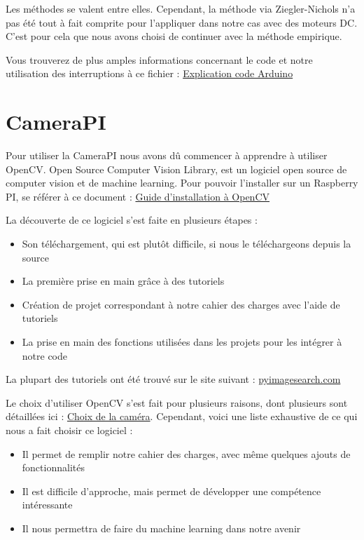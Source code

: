 \documentclass[
	a4paper,									%
	11pt,										%
	twoside,									%
	openright,									%
	notitlepage,									%
	parskip=half,								%
]{scrreprt}										%
\begin{document}
Les méthodes se valent entre elles. Cependant, la méthode via Ziegler-Nichols n'a pas été tout à fait comprite pour l'appliquer 
dans notre cas avec des moteurs DC. C'est pour cela que nous avons choisi de continuer avec la méthode empirique. \par


Vous trouverez de plus amples informations concernant le code et notre utilisation des interruptions
à ce fichier : \href{run:./Code_Arduino.pdf}{Explication code Arduino}



\section{CameraPI}

Pour utiliser la CameraPI nous avons dû commencer à apprendre à utiliser OpenCV. 
Open Source Computer Vision Library, est un logiciel open source de computer vision et de machine learning. 
Pour pouvoir l'installer sur un Raspberry PI, se référer à ce document : \href{run:./Installation_OpenCV.pdf}{Guide d'installation à OpenCV}\par

La découverte de ce logiciel s'est faite en plusieurs étapes : 

\begin{itemize}
	\item Son téléchargement, qui est plutôt difficile, si nous le téléchargeons depuis la source
	\item La première prise en main grâce à des tutoriels
	\item Création de projet correspondant à notre cahier des charges avec l'aide de tutoriels
	\item La prise en main des fonctions utilisées dans les projets pour les intégrer à notre code
\end{itemize}

La plupart des tutoriels ont été trouvé sur le site suivant : \href{https://pyimagesearch.com/}{pyimagesearch.com} \par

Le choix d'utiliser OpenCV s'est fait pour plusieurs raisons, dont plusieurs sont détaillées ici : \href{run:./Choix_Camera.pdf}{Choix de la caméra}. 
Cependant, voici une liste exhaustive de ce qui nous a fait choisir ce logiciel :

\begin{itemize}
	\item Il permet de remplir notre cahier des charges, avec même quelques ajouts de fonctionnalités
	\item Il est difficile d'approche, mais permet de développer une compétence intéressante
	\item Il nous permettra de faire du machine learning dans notre avenir
\end{itemize}
\end{document}
